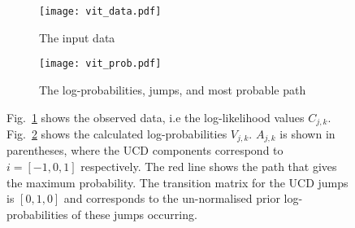\begin{figure}
\centering
\begin{subfigure}[h]{0.8\columnwidth}
\texttt{[image: vit\_data.pdf]}
\caption{The input data}
\label{viterbi:plot:data}
\end{subfigure}

\begin{subfigure}[h]{0.8\columnwidth}
\texttt{[image: vit\_prob.pdf]}
\caption{The log-probabilities, jumps, and most probable path}
\label{viterbi:plot:likelihood}
\end{subfigure}

\caption{ Fig.~\ref{viterbi:plot:data} shows
the observed data, i.e the log-likelihood values $C_{j,k}$. Fig.~\ref{viterbi:plot:likelihood} shows the calculated
log-probabilities $V_{j,k}$. $A_{j,k}$ is shown in parentheses, where the \ac{UCD}
components correspond to $i= [-1,0,1]$ respectively. The red line shows the
path that gives the maximum probability. The transition matrix for the \ac{UCD} jumps is $[0,1,0]$ and corresponds to the un-normalised prior
log-probabilities of these jumps occurring.}
\label{viterbi:plots}
\end{figure}

